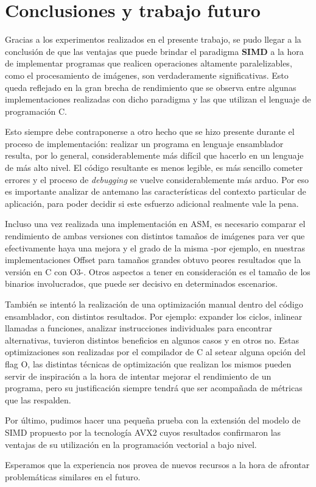 \section{Conclusiones y trabajo futuro}

Gracias a los experimentos realizados en el presente trabajo, se pudo llegar a la conclusión de que las ventajas que puede brindar el paradigma \textbf{SIMD} a la hora de implementar programas que realicen operaciones altamente paralelizables, como el procesamiento de imágenes, son verdaderamente significativas. Esto queda reflejado en la gran brecha de rendimiento que se observa entre algunas implementaciones realizadas con dicho paradigma y las que utilizan el lenguaje de programación C.

Esto siempre debe contraponerse a otro hecho que se hizo presente durante el proceso de implementación: realizar un programa en lenguaje ensamblador resulta, por lo general, considerablemente más difícil que hacerlo en un lenguaje de más alto nivel. El código resultante es menos legible, es más sencillo cometer errores y el proceso de \emph{debugging} se vuelve considerablemente más arduo. Por eso es importante analizar de antemano las características del contexto particular de aplicación, para poder decidir si este esfuerzo adicional realmente vale la pena.

Incluso una vez realizada una implementación en ASM, es necesario comparar el rendimiento de ambas versiones con distintos tamaños de imágenes para ver que efectivamente haya una mejora y el grado de la misma -por ejemplo, en nuestras implementaciones Offset para tamaños grandes obtuvo peores resultados que la versión en C con O3-. Otros aspectos a tener en consideración es el tamaño de los binarios involucrados, que puede ser decisivo en determinados escenarios.

También se intentó la realización de una optimización manual dentro del código ensamblador, con distintos resultados. Por ejemplo: expander los ciclos, inlinear llamadas a funciones, analizar instrucciones individuales para encontrar alternativas, tuvieron distintos beneficios en algunos casos y en otros no. Estas optimizaciones son realizadas por el compilador de C al setear alguna opción del flag O, las distintas técnicas de optimización que realizan los mismos pueden servir de inspiración a la hora de intentar mejorar el rendimiento de un programa, pero su justificación siempre tendrá que ser acompañada de métricas que las respalden.

Por último, pudimos hacer una pequeña prueba con la extensión del modelo de SIMD propuesto por la tecnología AVX2 cuyos resultados confirmaron las ventajas de su utilización en la programación vectorial a bajo nivel.

Esperamos que la experiencia nos provea de nuevos recursos a la hora de afrontar problemáticas similares en el futuro.